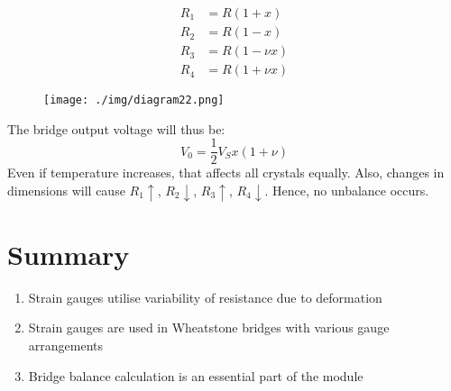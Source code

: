 \begin{align}
  R_1 & = R(1+x)       \\
  R_2 & = R(1-x)       \\
  R_3 & = R(1-\nu x)   \\
  R_4 & = R(1 + \nu x)
\end{align}
\begin{figure}[H]
  \centering
  \texttt{[image: ./img/diagram22.png]}
\end{figure}
The bridge output voltage will thus be:
\begin{equation}
  V_0 = \frac{1}{2} V_S x (1 + \nu)
\end{equation}
Even if temperature increases, that affects all crystals equally. Also, changes in dimensions will cause $R_1 \uparrow$, $R_2 \downarrow$, $R_3 \uparrow$, $R_4 \downarrow$. Hence, no unbalance occurs.
\section{Summary}
\begin{enumerate}[noitemsep]
  \item Strain gauges utilise variability of resistance due to deformation
  \item Strain gauges are used in Wheatstone bridges with various gauge arrangements
  \item Bridge balance calculation is an essential part of the module
\end{enumerate}